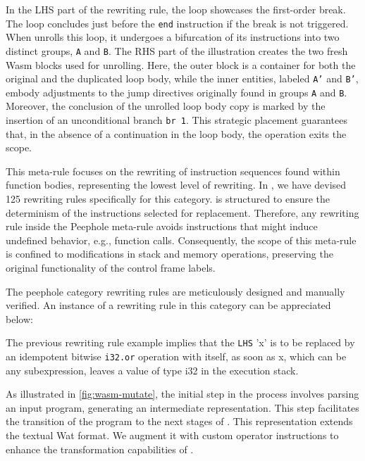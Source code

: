 In the LHS part of the rewriting rule, the loop showcases the first-order break.
The loop concludes just before the \texttt{end} instruction if the break is not triggered.
When \tool unrolls this loop, it undergoes a bifurcation of its instructions into two distinct groups, \texttt{A} and \texttt{B}. 
The RHS part of the illustration creates the two fresh Wasm blocks used for unrolling. 
Here, the outer block is a container for both the original and the duplicated loop body, while the inner entities, labeled \texttt{A'} and \texttt{B'}, embody adjustments to the jump directives originally found in groups \texttt{A} and \texttt{B}.
Moreover, the conclusion of the unrolled loop body copy is marked by the insertion of an unconditional branch \texttt{br 1}. 
This strategic placement guarantees that, in the absence of a continuation in the loop body, the operation exits the scope.


This meta-rule focuses on the rewriting of instruction sequences found within function bodies, representing the lowest level of rewriting. 
In \tool, we have devised 125 rewriting rules specifically for this category.
\tool is structured to ensure the determinism of the instructions selected for replacement.
Therefore, any rewriting rule inside the Peephole meta-rule avoids instructions that might induce undefined behavior, e.g., function calls.
Consequently, the scope of this meta-rule is confined to modifications in stack and memory operations, preserving the original functionality of the control frame labels.

The peephole category rewriting rules are meticulously designed and manually verified. 
An instance of a rewriting rule in this category can be appreciated below:



The previous rewriting rule example implies that the \texttt{LHS} 'x' is to be replaced by an idempotent bitwise \texttt{i32.or} operation with itself,  as soon as x, which can be any subexpression, leaves a value of type i32 in the execution stack.

\label{custom}

As illustrated in \autoref{fig:wasm-mutate}, the initial step in the process involves parsing an input \Wasm program, generating an intermediate representation. 
This step facilitates the transition of the \Wasm program to the next stages of \tool. 
This representation extends the textual Wat format.
We augment it with custom operator instructions to enhance the transformation capabilities of \tool.


